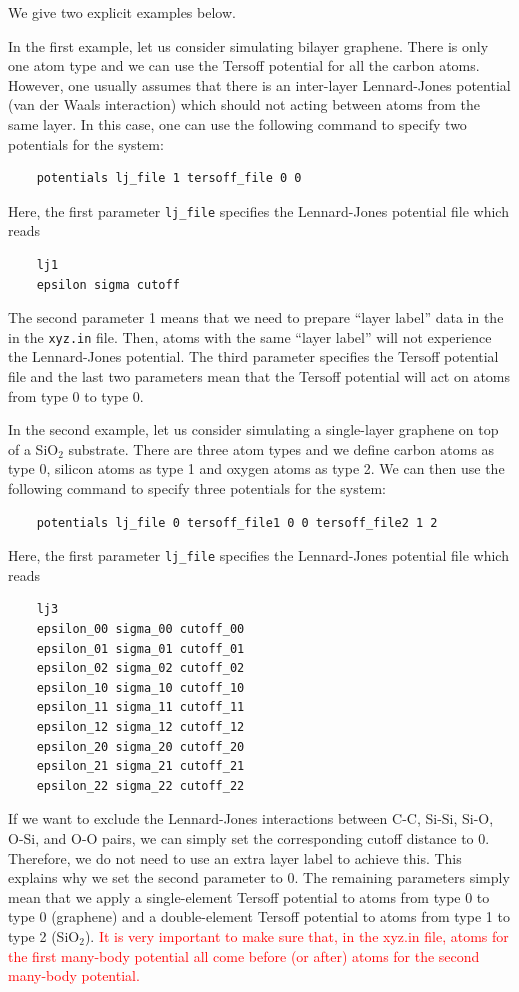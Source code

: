\documentclass[12pt,a4paper]{report}
\begin{document}
We give two explicit examples below.

In the first example, let us consider simulating bilayer graphene. There is only one atom type and we can use the Tersoff potential for all the carbon atoms. However, one usually assumes that there is an inter-layer Lennard-Jones potential (van der Waals interaction) which should not acting between atoms from the same layer. In this case, one can use the following command to specify two potentials for the system:
\begin{verbatim}
    potentials lj_file 1 tersoff_file 0 0
\end{verbatim}
Here,  the first parameter \verb"lj_file" specifies the Lennard-Jones potential file which reads 
\begin{verbatim}
    lj1
    epsilon sigma cutoff
\end{verbatim}
The second parameter 1 means that we need to prepare ``layer label'' data in the  in the  \verb"xyz.in" file. Then, atoms with the same ``layer label'' will not experience the Lennard-Jones potential. The third parameter specifies the Tersoff potential file and the last two parameters mean that the Tersoff potential will act on atoms from type 0 to type 0.


In the second example, let us consider simulating a single-layer graphene on top of a SiO$_2$ substrate. There are three atom types and we define carbon atoms as type 0, silicon atoms as type 1 and oxygen atoms as type 2. We can then use the following command to specify three potentials for the system:
\begin{verbatim}
    potentials lj_file 0 tersoff_file1 0 0 tersoff_file2 1 2
\end{verbatim}
Here,  the first parameter \verb"lj_file" specifies the Lennard-Jones potential file which reads 
\begin{verbatim}
    lj3
    epsilon_00 sigma_00 cutoff_00
    epsilon_01 sigma_01 cutoff_01
    epsilon_02 sigma_02 cutoff_02
    epsilon_10 sigma_10 cutoff_10
    epsilon_11 sigma_11 cutoff_11
    epsilon_12 sigma_12 cutoff_12
    epsilon_20 sigma_20 cutoff_20
    epsilon_21 sigma_21 cutoff_21
    epsilon_22 sigma_22 cutoff_22
\end{verbatim}
If we want to exclude the Lennard-Jones interactions between C-C, Si-Si, Si-O, O-Si, and O-O pairs, we can simply set the corresponding cutoff distance to 0. Therefore, we do not need to use an extra layer label to achieve this. This explains why we set the second parameter to 0. The remaining parameters simply mean that we apply a single-element Tersoff potential to atoms from type 0 to type 0 (graphene) and a double-element Tersoff potential to atoms from type 1 to type 2 (SiO$_2$). \textcolor{red}{It is very important to make sure that, in the xyz.in file, atoms for the first many-body potential all come before (or after) atoms for the second many-body potential.}
\end{document}
